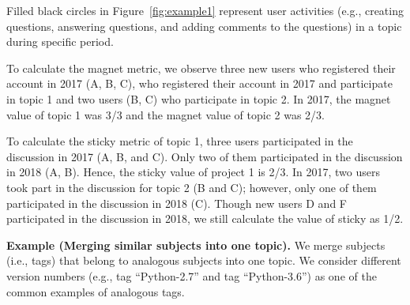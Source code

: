 \documentclass[conference]{IEEEtran}
\begin{document}
Filled black circles in Figure~\ref{fig:example1} represent user activities (e.g., creating questions, answering questions, and adding comments to the questions) in a topic during specific period.

To calculate the magnet metric, we observe three new users who registered their account in 2017 (A, B, C), who registered their account in 2017 and participate in topic 1 and two users (B, C) who participate in topic 2. In 2017, the magnet value of topic 1 was 3/3 and the magnet value of topic 2 was 2/3.

To calculate the sticky metric of topic 1, three users participated in the discussion in 2017 (A, B, and C). Only two of them participated in the discussion in 2018 (A, B). Hence, the sticky value of project 1 is 2/3. In 2017, two users took part in the discussion for topic 2 (B and C); however, only one of them participated in the discussion in 2018 (C). Though new users D and F participated in the discussion in 2018, we still calculate the value of sticky as 1/2.

\noindent
\textbf{Example (Merging similar subjects into one topic).}
We merge subjects (i.e., tags) that belong to analogous subjects into one topic. We consider different version numbers (e.g., tag ``Python-2.7'' and tag ``Python-3.6'') as one of the common examples of analogous tags. 
\end{document}
